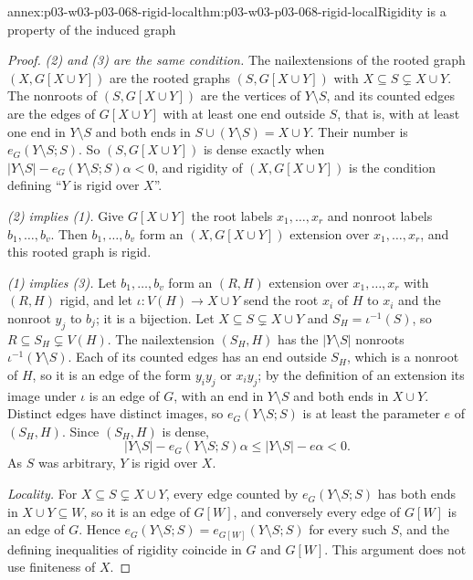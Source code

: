 \begin{annexitem}{annex:p03-w03-p03-068-rigid-local}{thm:p03-w03-p03-068-rigid-local}{Rigidity is a property of the induced graph}
\begin{proof}
\emph{(2) and (3) are the same condition.}  The nailextensions of the
rooted graph \((X,G[X\cup Y])\) are the rooted graphs \((S,G[X\cup Y])\) with
\(X\subseteq S\subsetneq X\cup Y\).  The nonroots of \((S,G[X\cup Y])\) are
the vertices of \(Y\setminus S\), and its counted edges are the edges of
\(G[X\cup Y]\) with at least one end outside \(S\), that is, with at least
one end in \(Y\setminus S\) and both ends in \(S\cup(Y\setminus S)=X\cup Y\).
Their number is \(e_G(Y\setminus S;S)\).  So \((S,G[X\cup Y])\) is dense
exactly when \(|Y\setminus S|-e_G(Y\setminus S;S)\alpha<0\), and rigidity of
\((X,G[X\cup Y])\) is the condition defining ``\(Y\) is rigid over \(X\)''.

\emph{(2) implies (1).}  Give \(G[X\cup Y]\) the root labels
\(x_1,\ldots,x_r\) and nonroot labels \(b_1,\ldots,b_v\).  Then
\(b_1,\ldots,b_v\) form an \((X,G[X\cup Y])\) extension over
\(x_1,\ldots,x_r\), and this rooted graph is rigid.

\emph{(1) implies (3).}  Let \(b_1,\ldots,b_v\) form an \((R,H)\) extension
over \(x_1,\ldots,x_r\) with \((R,H)\) rigid, and let \(\iota\colon V(H)\to
X\cup Y\) send the root \(x_i\) of \(H\) to \(x_i\) and the nonroot \(y_j\) to
\(b_j\); it is a bijection.  Let \(X\subseteq S\subsetneq X\cup Y\) and
\(S_H=\iota^{-1}(S)\), so \(R\subseteq S_H\subsetneq V(H)\).  The nailextension
\((S_H,H)\) has the \(|Y\setminus S|\) nonroots \(\iota^{-1}(Y\setminus S)\).
Each of its counted edges has an end outside \(S_H\), which is a nonroot of
\(H\), so it is an edge of the form \(y_iy_j\) or \(x_iy_j\); by the definition
of an extension its image under \(\iota\) is an edge of \(G\), with an end in
\(Y\setminus S\) and both ends in \(X\cup Y\).  Distinct edges have distinct
images, so \(e_G(Y\setminus S;S)\) is at least the parameter \(e\) of
\((S_H,H)\).  Since \((S_H,H)\) is dense,
\[
  |Y\setminus S|-e_G(Y\setminus S;S)\alpha\leq|Y\setminus S|-e\alpha<0 .
\]
As \(S\) was arbitrary, \(Y\) is rigid over \(X\).

\emph{Locality.}  For \(X\subseteq S\subsetneq X\cup Y\), every edge counted
by \(e_G(Y\setminus S;S)\) has both ends in \(X\cup Y\subseteq W\), so it is an
edge of \(G[W]\), and conversely every edge of \(G[W]\) is an edge of \(G\).
Hence \(e_G(Y\setminus S;S)=e_{G[W]}(Y\setminus S;S)\) for every such \(S\), and
the defining inequalities of rigidity coincide in \(G\) and \(G[W]\).  This
argument does not use finiteness of \(X\).
\end{proof}
\end{annexitem}

